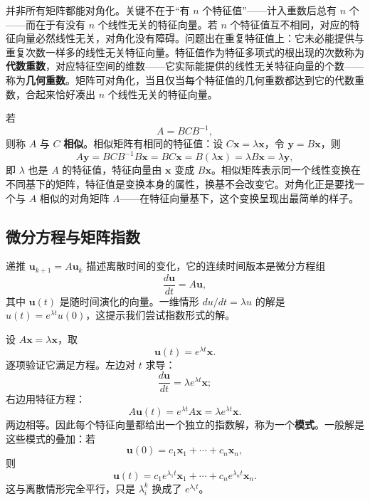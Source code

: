 \documentclass[UTF8,a4paper,12pt]{ctexart}
\numberwithin{equation}{section}
\begin{document}
	并非所有矩阵都能对角化。关键不在于“有 $n$ 个特征值”——计入重数后总有 $n$ 个——而在于有没有 $n$ 个线性无关的特征向量。若 $n$ 个特征值互不相同，对应的特征向量必然线性无关，对角化没有障碍。问题出在重复特征值上：它未必能提供与重复次数一样多的线性无关特征向量。特征值作为特征多项式的根出现的次数称为\textbf{代数重数}，对应特征空间的维数——它实际能提供的线性无关特征向量的个数——称为\textbf{几何重数}。矩阵可对角化，当且仅当每个特征值的几何重数都达到它的代数重数，合起来恰好凑出 $n$ 个线性无关的特征向量。

	若
	\begin{equation}\label{eq:7.41}
	A=BCB^{-1},
	\end{equation}
	则称 $A$ 与 $C$ \textbf{相似}。相似矩阵有相同的特征值：设 $C\bm{x}=\lambda\bm{x}$，令 $\bm{y}=B\bm{x}$，则
	\begin{equation}\label{eq:7.42}
	A\bm{y}=BCB^{-1}B\bm{x}=BC\bm{x}=B(\lambda\bm{x})=\lambda B\bm{x}=\lambda\bm{y},
	\end{equation}
	即 $\lambda$ 也是 $A$ 的特征值，特征向量由 $\bm{x}$ 变成 $B\bm{x}$。相似矩阵表示同一个线性变换在不同基下的矩阵，特征值是变换本身的属性，换基不会改变它。对角化正是要找一个与 $A$ 相似的对角矩阵 $\Lambda$——在特征向量基下，这个变换呈现出最简单的样子。

	\subsection{微分方程与矩阵指数}

	递推 $\bm{u}_{k+1}=A\bm{u}_k$ 描述离散时间的变化，它的连续时间版本是微分方程组
	\begin{equation}\label{eq:7.43}
	\frac{d\bm{u}}{dt}=A\bm{u},
	\end{equation}
	其中 $\bm{u}(t)$ 是随时间演化的向量。一维情形 $du/dt=\lambda u$ 的解是 $u(t)=e^{\lambda t}u(0)$，这提示我们尝试指数形式的解。

	设 $A\bm{x}=\lambda\bm{x}$，取
	\begin{equation}\label{eq:7.44}
	\bm{u}(t)=e^{\lambda t}\bm{x}.
	\end{equation}
	逐项验证它满足方程。左边对 $t$ 求导：
	\begin{equation}\label{eq:7.45}
	\frac{d\bm{u}}{dt}
	=\lambda e^{\lambda t}\bm{x};
	\end{equation}
	右边用特征方程：
	\begin{equation}\label{eq:7.46}
	A\bm{u}(t)
	=e^{\lambda t}A\bm{x}
	=\lambda e^{\lambda t}\bm{x}.
	\end{equation}
	两边相等。因此每个特征向量都给出一个独立的指数解，称为一个\textbf{模式}。一般解是这些模式的叠加：若
	\begin{equation}\label{eq:7.47}
	\bm{u}(0)=c_1\bm{x}_1+\cdots+c_n\bm{x}_n,
	\end{equation}
	则
	\begin{equation}\label{eq:7.48}
	\bm{u}(t)=c_1e^{\lambda_1 t}\bm{x}_1+\cdots+c_ne^{\lambda_n t}\bm{x}_n.
	\end{equation}
	这与离散情形完全平行，只是 $\lambda_i^k$ 换成了 $e^{\lambda_i t}$。
\end{document}
